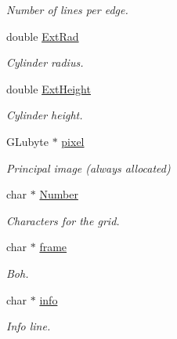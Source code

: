 \begin{DoxyCompactItemize}
\begin{DoxyCompactList}\small\item\em \-Number of lines per edge. \end{DoxyCompactList}\item 
\hypertarget{classDraw_adc5d60532f408b3328a02355c35f99d7}{double \hyperlink{classDraw_adc5d60532f408b3328a02355c35f99d7}{\-Ext\-Rad}}\label{classDraw_adc5d60532f408b3328a02355c35f99d7}

\begin{DoxyCompactList}\small\item\em \-Cylinder radius. \end{DoxyCompactList}\item 
\hypertarget{classDraw_ae61302982a6baa4f5d27af2a2288ef5a}{double \hyperlink{classDraw_ae61302982a6baa4f5d27af2a2288ef5a}{\-Ext\-Height}}\label{classDraw_ae61302982a6baa4f5d27af2a2288ef5a}

\begin{DoxyCompactList}\small\item\em \-Cylinder height. \end{DoxyCompactList}\item 
\hypertarget{classDraw_a4fb2b9ce0df5949d526526b8710e4bf2}{\-G\-Lubyte $\ast$ \hyperlink{classDraw_a4fb2b9ce0df5949d526526b8710e4bf2}{pixel}}\label{classDraw_a4fb2b9ce0df5949d526526b8710e4bf2}

\begin{DoxyCompactList}\small\item\em \-Principal image (always allocated) \end{DoxyCompactList}\item 
\hypertarget{classDraw_a4af3f2fea4f5121fb8a95778c80823bf}{char $\ast$ \hyperlink{classDraw_a4af3f2fea4f5121fb8a95778c80823bf}{\-Number}}\label{classDraw_a4af3f2fea4f5121fb8a95778c80823bf}

\begin{DoxyCompactList}\small\item\em \-Characters for the grid. \end{DoxyCompactList}\item 
\hypertarget{classDraw_a3084ae24ee3789483bb71ae809decedf}{char $\ast$ \hyperlink{classDraw_a3084ae24ee3789483bb71ae809decedf}{frame}}\label{classDraw_a3084ae24ee3789483bb71ae809decedf}

\begin{DoxyCompactList}\small\item\em \-Boh. \end{DoxyCompactList}\item 
\hypertarget{classDraw_a65627378647d3a125ae55432f3f569e2}{char $\ast$ \hyperlink{classDraw_a65627378647d3a125ae55432f3f569e2}{info}}\label{classDraw_a65627378647d3a125ae55432f3f569e2}

\begin{DoxyCompactList}\small\item\em \-Info line. \end{DoxyCompactList}\end{DoxyCompactItemize}


